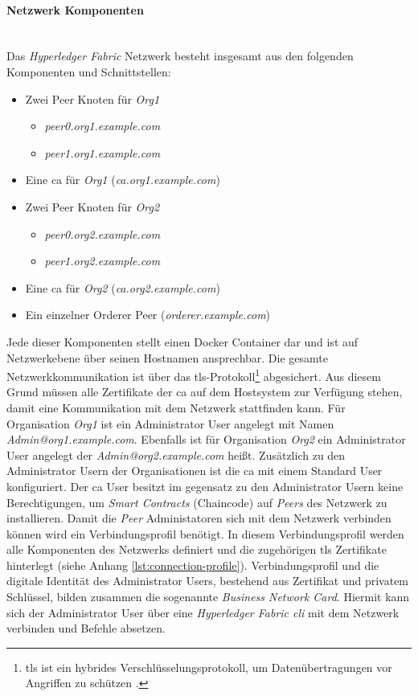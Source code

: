 \paragraph{Netzwerk Komponenten}$~~$\\
Das \textit{Hyperledger Fabric} Netzwerk besteht insgesamt aus den folgenden Komponenten und Schnittstellen:

\begin{itemize}
    \item Zwei Peer Knoten für \textit{Org1}
    \begin{itemize}
        \item \textit{peer0.org1.example.com}
        \item \textit{peer1.org1.example.com}
    \end{itemize}
    \item Eine \ac{ca} für \textit{Org1} (\textit{ca.org1.example.com})
    \item Zwei Peer Knoten für \textit{Org2}
    \begin{itemize}
        \item \textit{peer0.org2.example.com}
        \item \textit{peer1.org2.example.com}
    \end{itemize}
    \item Eine \ac{ca} für \textit{Org2} (\textit{ca.org2.example.com})
    \item Ein einzelner Orderer Peer (\textit{orderer.example.com})
\end{itemize}

\noindent
Jede dieser Komponenten stellt einen Docker Container dar und ist auf Netzwerkebene über seinen Hostnamen ansprechbar. Die gesamte Netzwerkkommunikation ist über das \ac{tls}-Protokoll\footnote{\ac{tls} ist ein hybrides Verschlüsselungsprotokoll, um Datenübertragungen vor Angriffen zu schützen \citep{RFC5246}.} abgesichert. Aus diesem Grund müssen alle Zertifikate der \ac{ca} auf dem Hostsystem zur Verfügung stehen, damit eine Kommunikation mit dem Netzwerk stattfinden kann. Für Organisation \textit{Org1} ist ein Administrator User angelegt mit Namen \textit{Admin@org1.example.com}. Ebenfalls ist für Organisation \textit{Org2} ein Administrator User angelegt der \textit{Admin@org2.example.com} heißt. Zusätzlich zu den Administrator Usern der Organisationen ist die \ac{ca} mit einem Standard User konfiguriert. Der \ac{ca} User besitzt im gegensatz zu den Administrator Usern keine Berechtigungen, um \textit{Smart Contracts} (Chaincode) auf \textit{Peers} des Netzwerk zu installieren. Damit die \textit{Peer} Administatoren sich mit dem Netzwerk verbinden können wird ein Verbindungsprofil benötigt. In diesem Verbindungsprofil werden alle Komponenten des Netzwerks definiert und die zugehörigen \ac{tls} Zertifikate hinterlegt (siehe Anhang \ref{lst:connection-profile}). Verbindungsprofil und die digitale Identität des Administrator Users, bestehend aus Zertifikat und privatem Schlüssel, bilden zusammen die sogenannte \textit{Business Network Card}. Hiermit kann sich der Administrator User über eine \textit{Hyperledger Fabric \ac{cli}} mit dem Netzwerk verbinden und Befehle absetzen.

